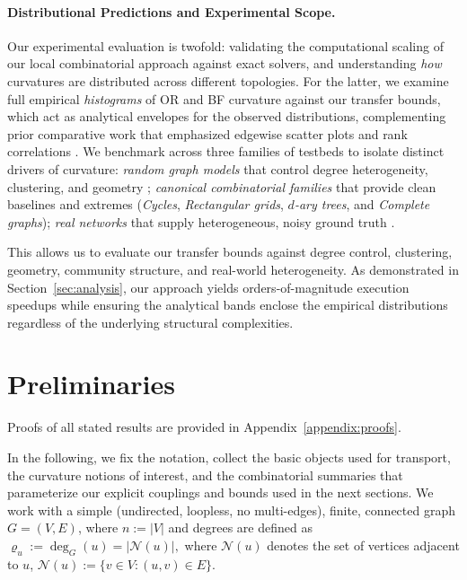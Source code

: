 \documentclass[twoside,11pt]{article}
\numberwithin{equation}{section}
\numberwithin{theorem}{section}
\numberwithin{example}{section}
\begin{document}
\paragraph{Distributional Predictions and Experimental Scope.}
Our experimental evaluation is twofold: validating the computational scaling of our local combinatorial approach against exact solvers, and understanding \emph{how} curvatures are distributed across different topologies. For the latter, we examine full empirical \emph{histograms} of OR and BF curvature against our transfer bounds, which act as analytical envelopes for the observed distributions, complementing prior comparative work that emphasized edgewise scatter plots and rank correlations \citep{sreejith_systematic_2017, samal_comparative_2018}. We benchmark across three families of testbeds to isolate distinct drivers of curvature: \emph{random graph models} that control degree heterogeneity, clustering, and geometry \citep{erdos_random_1959,watts_collective_1998,barabasi_emergence_1999,penrose_random_2003,steger_generating_1999,holland_stochastic_1983,krioukov_hyperbolic_2010}; \emph{canonical combinatorial families} that provide clean baselines and extremes (\emph{Cycles}, \emph{Rectangular grids}, \emph{$d$-ary trees}, and \emph{Complete graphs}); \emph{real networks} that supply heterogeneous, noisy ground truth \citep{zachary_karate_1977,gleiser_community_2003,watts_collective_1998,milo_motifs_2002,gehrke_arxiv_2003}.

This allows us to evaluate our transfer bounds against degree control, clustering, geometry, community structure, and real-world heterogeneity. As demonstrated in Section~\ref{sec:analysis}, our approach yields orders-of-magnitude execution speedups while ensuring the analytical bands enclose the empirical distributions regardless of the underlying structural complexities.


\section{Preliminaries}
\label{sec:prelims}
\begin{remark}
Proofs of all stated results are provided in Appendix~\ref{appendix:proofs}.
\end{remark}
In the following, we fix the notation, collect the basic objects used for transport, the curvature notions of interest, and the combinatorial summaries that parameterize our explicit couplings and bounds used in the next sections. We work with a simple (undirected, loopless, no multi-edges), finite, connected graph \(G=(V,E)\), where $n:=|V|$ and degrees are defined as
\(
\varrho_u:=\deg_G(u)=|\mathcal N(u)|,
\)
where $\mathcal N(u)$ denotes the set of vertices adjacent to $u$,
\(
\mathcal N(u):=\{v\in V:(u,v)\in E\}.
\)
\end{document}
